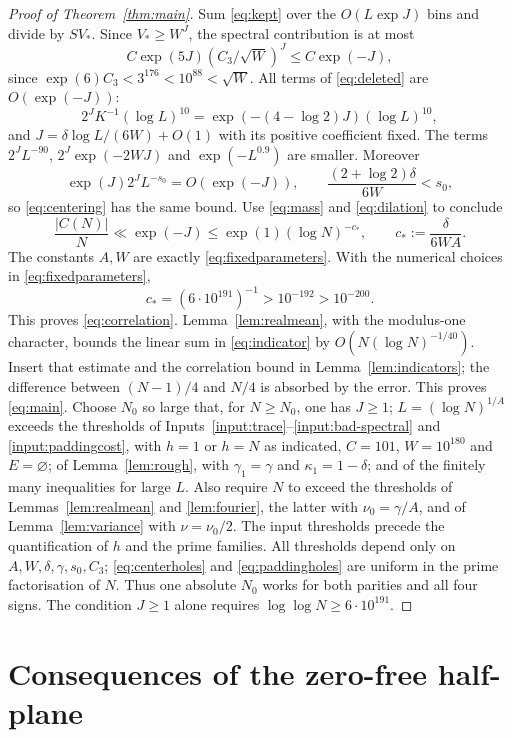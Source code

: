 \documentclass[11pt]{article}
\theoremstyle{definition}
\begin{document}
\begin{proof}[Proof of Theorem~\ref{thm:main}]
Sum \eqref{eq:kept} over the $O(L\exp J)$ bins and divide by $SV_*$.
Since $V_*\ge W^J$, the spectral contribution is at most
\[
 C\exp(5J)(C_3/\sqrt W)^J\le C\exp(-J),
\]
since $\exp(6)C_3<3^{176}<10^{88}<\sqrt W$.
All terms of \eqref{eq:deleted} are $O(\exp(-J))$:
\[
 2^JK^{-1}(\log L)^{10}=\exp(-(4-\log2)J)(\log L)^{10},
\]
and $J=\delta\log L/(6W)+O(1)$ with its positive coefficient fixed.
The terms $2^JL^{-90}$, $2^J\exp(-2WJ)$ and $\exp(-L^{0.9})$ are
smaller. Moreover
\[
 \exp(J)2^JL^{-s_0}=O(\exp(-J)),
 \qquad \frac{(2+\log2)\delta}{6W}<s_0,
\]
so \eqref{eq:centering} has the same bound.
Use \eqref{eq:mass} and \eqref{eq:dilation} to conclude
\[
 \frac{|C(N)|}{N}\ll\exp(-J)
 \le\exp(1)(\log N)^{-c_*},\qquad
 c_*:=\frac{\delta}{6WA}.
\]
The constants $A,W$ are exactly \eqref{eq:fixedparameters}.
With the numerical choices in \eqref{eq:fixedparameters},
\[
 c_*=(6\cdot10^{191})^{-1}>10^{-192}>10^{-200}.
\]
This proves \eqref{eq:correlation}.
Lemma~\ref{lem:realmean}, with the modulus-one character, bounds the
linear sum in \eqref{eq:indicator} by
$O(N(\log N)^{-1/40})$.
Insert that estimate and the correlation bound in
Lemma~\ref{lem:indicators}; the difference between $(N-1)/4$ and $N/4$
is absorbed by the error. This proves \eqref{eq:main}.
Choose $N_0$ so large that, for $N\ge N_0$, one has $J\ge1$;
$L=(\log N)^{1/A}$ exceeds the thresholds of
Inputs~\ref{input:trace}--\ref{input:bad-spectral} and
\ref{input:paddingcost}, with $h=1$ or $h=N$ as indicated,
$C=101$, $W=10^{180}$ and $E=\varnothing$;
of Lemma~\ref{lem:rough}, with $\gamma_1=\gamma$ and
$\kappa_1=1-\delta$; and of the finitely many inequalities for large $L$.
Also require $N$ to exceed the thresholds of
Lemmas~\ref{lem:realmean} and \ref{lem:fourier}, the latter with
$\nu_0=\gamma/A$, and of Lemma~\ref{lem:variance} with $\nu=\nu_0/2$.
The input thresholds precede the quantification of $h$ and the prime
families. All thresholds depend only on $A,W,\delta,\gamma,s_0,C_3$;
\eqref{eq:centerholes} and \eqref{eq:paddingholes} are uniform in the
prime factorisation of $N$. Thus one absolute $N_0$ works for both
parities and all four signs. The condition $J\ge1$ alone requires
$\log\log N\ge6\cdot10^{191}$.
\end{proof}

\part{Consequences of the zero-free half-plane}
\end{document}
